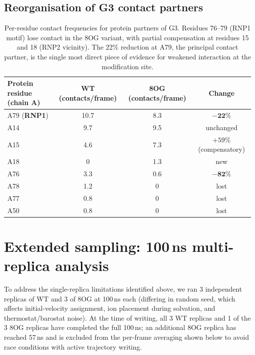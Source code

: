\documentclass[11pt,a4paper]{article}
\begin{document}
\subsection{Reorganisation of G3 contact partners}

\begin{table}[h]
\centering
\small
\begin{tabular}{lccc}
\toprule
Protein residue (chain A) & WT (contacts/frame) & 8OG (contacts/frame) & Change \\
\midrule
A79 (\textbf{RNP1}) & 10.7 & 8.3 & $\mathbf{-22\%}$ \\
A14                 & 9.7  & 9.5 & unchanged \\
A15                 & 4.6  & 7.3 & $+59\%$ (compensatory) \\
A18                 & 0    & 1.3 & new \\
A76                 & 3.3  & 0.6 & $\mathbf{-82\%}$ \\
A78                 & 1.2  & 0   & lost \\
A77                 & 0.8  & 0   & lost \\
A50                 & 0.8  & 0   & lost \\
\bottomrule
\end{tabular}
\caption{Per-residue contact frequencies for protein partners of G3.
Residues 76--79 (RNP1 motif) lose contact in the 8OG variant, with
partial compensation at residues 15 and 18 (RNP2 vicinity). The
22\% reduction at A79, the principal contact partner, is the single
most direct piece of evidence for weakened interaction at the
modification site.}
\label{tab:partners}
\end{table}

\section{Extended sampling: 100\,ns multi-replica analysis}
\label{sec:long}

To address the single-replica limitations identified above, we ran
3 independent replicas of WT and 3 of 8OG at 100\,ns each
(differing in random seed, which affects initial-velocity assignment,
ion placement during solvation, and thermostat/barostat noise). At
the time of writing, all 3 WT replicas and 1 of the 3 8OG replicas
have completed the full 100\,ns; an additional 8OG replica has reached
57\,ns and is excluded from the per-frame averaging shown below to
avoid race conditions with active trajectory writing.
\end{document}
